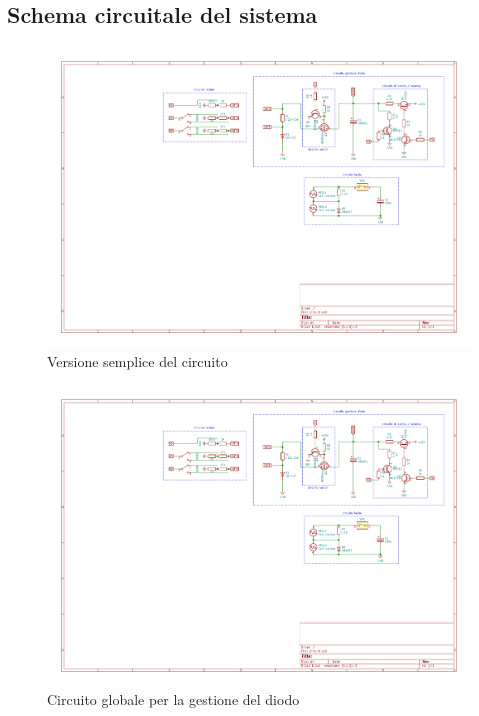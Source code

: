 \documentclass{article}[a4paper, oneside, 11pt]
\begin{document}
\subsection{Schema circuitale del sistema}
%
\begin{figure}[!htb]
	\centering 
 		\includegraphics[scale=2.2]{./simple.pdf}
 	\caption{Versione semplice del circuito \label{sch:smpl}}
\end{figure}
\begin{figure}[!htb]
	\centering 
 		\includegraphics[scale=1.3]{./gestione.pdf}
 	\caption{Circuito globale per la gestione del diodo \label{sch:gest}}
\end{figure}
\end{document}
